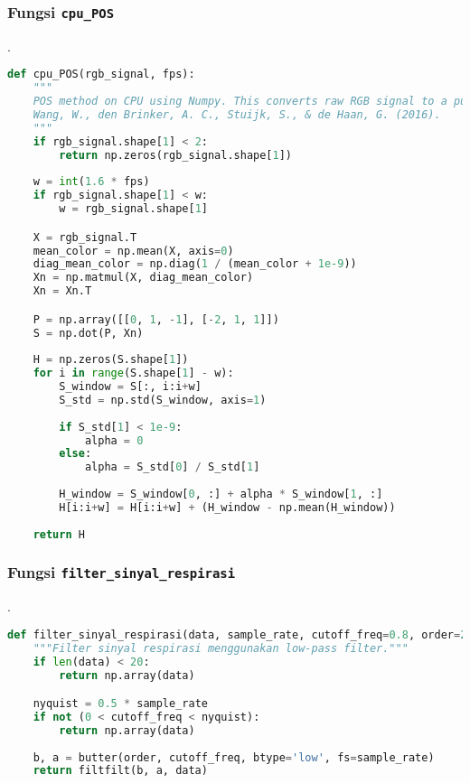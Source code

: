 \documentclass[11pt,a4paper]{article}
\begin{document}
\subsubsection{Fungsi \texttt{cpu\_POS}}.
     \begin{lstlisting}[language=Python, caption=Fungsi \texttt{cpu\_POS},label={labelkode}]
    def cpu_POS(rgb_signal, fps):
    """
    POS method on CPU using Numpy. This converts raw RGB signal to a pulse signal.
    Wang, W., den Brinker, A. C., Stuijk, S., & de Haan, G. (2016).
    """
    if rgb_signal.shape[1] < 2:
        return np.zeros(rgb_signal.shape[1])
        
    w = int(1.6 * fps)
    if rgb_signal.shape[1] < w:
        w = rgb_signal.shape[1]

    X = rgb_signal.T
    mean_color = np.mean(X, axis=0)
    diag_mean_color = np.diag(1 / (mean_color + 1e-9))
    Xn = np.matmul(X, diag_mean_color)
    Xn = Xn.T

    P = np.array([[0, 1, -1], [-2, 1, 1]])
    S = np.dot(P, Xn)
    
    H = np.zeros(S.shape[1])
    for i in range(S.shape[1] - w):
        S_window = S[:, i:i+w]
        S_std = np.std(S_window, axis=1)
        
        if S_std[1] < 1e-9:
            alpha = 0
        else:
            alpha = S_std[0] / S_std[1]
            
        H_window = S_window[0, :] + alpha * S_window[1, :]
        H[i:i+w] = H[i:i+w] + (H_window - np.mean(H_window))
        
    return H
    \end{lstlisting}
    
\subsubsection{Fungsi \texttt{filter\_sinyal\_respirasi}}.
     \begin{lstlisting}[language=Python, caption=Fungsi \texttt{filter\_sinyal\_respirasi},label={labelkode}]
    def filter_sinyal_respirasi(data, sample_rate, cutoff_freq=0.8, order=2):
    """Filter sinyal respirasi menggunakan low-pass filter."""
    if len(data) < 20:
        return np.array(data)

    nyquist = 0.5 * sample_rate
    if not (0 < cutoff_freq < nyquist):
        return np.array(data)
        
    b, a = butter(order, cutoff_freq, btype='low', fs=sample_rate)
    return filtfilt(b, a, data)
    \end{lstlisting}
\end{document}
